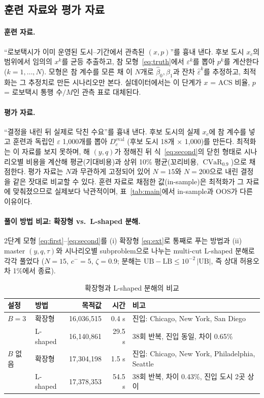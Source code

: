 \documentclass[10pt,a4paper]{article}
\DeclareMathOperator{\CVaR}{CVaR}
\begin{document}
\subsection{훈련 자료와 평가 자료}

\paragraph{훈련 자료.}
``로보택시가 이미 운영된 도시--기간에서 관측된 $(x,p)$''를 흉내 낸다. 후보 도시 $x_c$의 범위에서 임의의 $x^k$를 균등 추출하고, 참 모형~\eqref{eq:truth}에서 $\varepsilon^k$를 뽑아 $p^k$를 계산한다 ($k=1,\dots,N$). 모형은 참 계수를 모른 채 이 $N$개로 $\hat\beta_0,\hat\beta_1$과 잔차 $\hat\varepsilon^k$를 추정하고, 최적화는 그 추정치로 만든 시나리오만 본다. 실데이터에서는 이 단계가 $x$ = ACS 비율, $p$ = 로보택시 통행 수$/M$인 관측 표로 대체된다.

\paragraph{평가 자료.}
``결정을 내린 뒤 실제로 닥친 수요''를 흉내 낸다. 후보 도시의 실제 $x_c$에 참 계수를 넣고 훈련과 독립인 $\varepsilon$ 1{,}000개를 뽑아 $D^{\mathrm{eval}}_{c}$ (후보 도시 18개 $\times$ 1{,}000)를 만든다. 최적화는 이 자료를 보지 못하며, 해 $(y,q)$가 정해진 뒤 식~\eqref{eq:second}의 닫힌 형태로 시나리오별 비용을 계산해 평균(기대비용)과 상위 10\% 평균(꼬리비용, $\CVaR_{0.9}$)으로 채점한다. 평가 자료는 $N$과 무관하게 고정되어 있어 $N=15$와 $N=200$으로 내린 결정을 같은 잣대로 비교할 수 있다. 훈련 자료로 채점한 값(in-sample)은 최적화가 그 자료에 맞춰졌으므로 실제보다 낙관적이며, 표~\ref{tab:main}에서 in-sample과 OOS가 다른 이유이다.

\paragraph{풀이 방법 비교: 확장형 vs.\ L-shaped 분해.}
2단계 모형 \eqref{eq:first}--\eqref{eq:second}를 (i) 확장형 \eqref{eq:ext}로 통째로 푸는 방법과 (ii) master $(y,q,\tau)$와 시나리오별 subproblem으로 나누는 multi-cut L-shaped 분해로 각각 풀었다 ($N=15$, $c^-=5$, $\zeta=0.9$; 분해는 $\mathrm{UB}-\mathrm{LB}\le 10^{-2}\,|\mathrm{UB}|$, 즉 상대 허용오차 1\%에서 종료).

\begin{table}[H]\centering\small
\caption{확장형과 L-shaped 분해의 비교}\label{tab:solver}
\begin{tabular}{@{}llrrl@{}}
\toprule
설정 & 방법 & 목적값 & 시간 & 비고 \\ \midrule
$B=3$ & 확장형 & 16{,}036{,}515 & 0.4 s & 진입: Chicago, New York, San Diego \\
      & L-shaped & 16{,}140{,}861 & 29.5 s & 38회 반복, 진입 동일, 차이 0.65\% \\
$B$ 없음 & 확장형 & 17{,}304{,}198 & 1.5 s & 진입: Chicago, New York, Philadelphia, Seattle \\
      & L-shaped & 17{,}378{,}353 & 54.5 s & 38회 반복, 차이 0.43\%, 진입 도시 2곳 상이 \\
\bottomrule
\end{tabular}
\end{table}
\end{document}
